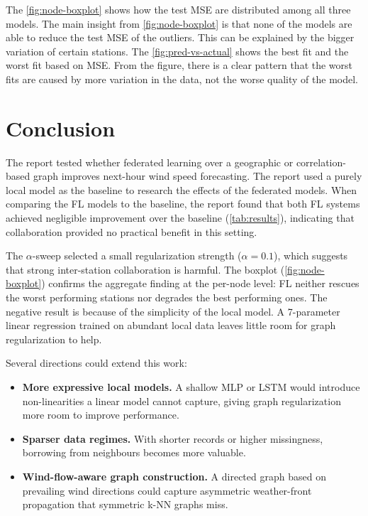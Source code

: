 \documentclass{article}
\begin{document}
The \cref{fig:node-boxplot} shows how the test MSE are distributed among all three models.
The main insight from \cref{fig:node-boxplot} is that none of the models are able to reduce
the test MSE of the outliers. This can be explained by the bigger variation of certain stations.
The \cref{fig:pred-vs-actual} shows the best fit and the worst fit based on MSE. From the figure,
there is a clear pattern that the worst fits are caused by more variation in the data,
not the worse quality of the model.

\section{Conclusion}
\label{sec:conclusion}

The report tested whether federated learning over a geographic or correlation-based
graph improves next-hour wind speed forecasting. The report used a purely local model
as the baseline to research the effects of the federated models. When comparing the
FL models to the baseline, the report found that both FL systems achieved
negligible improvement over the baseline (\cref{tab:results}), indicating that
collaboration provided no practical benefit in this setting.

The $\alpha$-sweep selected a small regularization strength ($\alpha = 0.1$), which
suggests that strong inter-station collaboration is harmful. The boxplot
(\cref{fig:node-boxplot}) confirms the aggregate finding at the per-node level:
FL neither rescues the worst performing stations nor degrades the best performing ones.
The negative result is because of the simplicity of the local model. A 7-parameter
linear regression trained on abundant local data leaves little room for graph
regularization to help.

Several directions could extend this work:
\begin{itemize}
	\item \textbf{More expressive local models.} A shallow MLP or LSTM would introduce
	      non-linearities a linear model cannot capture, giving graph regularization more
	      room to improve performance.
	\item \textbf{Sparser data regimes.} With shorter records or higher missingness,
	      borrowing from neighbours becomes more valuable.
	\item \textbf{Wind-flow-aware graph construction.} A directed graph based on
	      prevailing wind directions could capture asymmetric weather-front propagation
	      that symmetric k-NN graphs miss.
\end{itemize}




\end{document}
